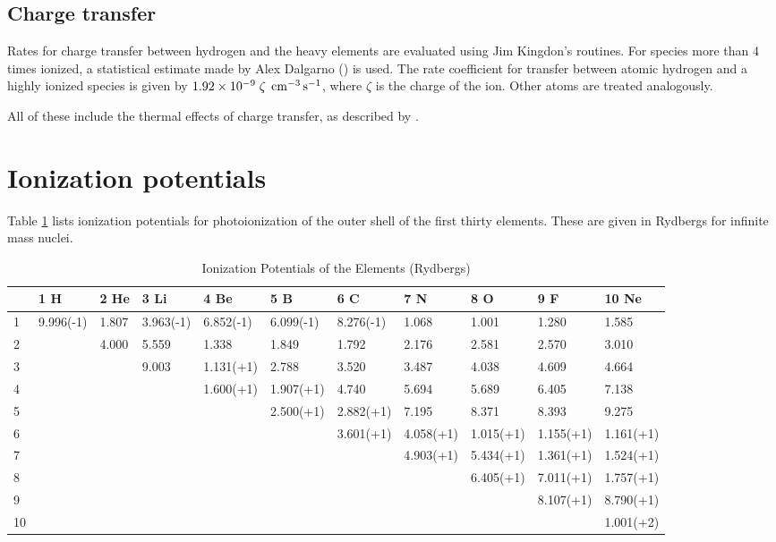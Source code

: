 \subsection{Charge transfer}

Rates for charge transfer between hydrogen and the heavy elements are
evaluated using Jim Kingdon's routines.   For species more than 4 times
ionized, a statistical estimate made by Alex Dalgarno (\citealp{Ferland1997})
is used.  The rate coefficient for transfer between atomic hydrogen and
a highly ionized species is given by
$1.92\times 10^{-9} \; \zeta \; {\rm\thinspace cm^{-3}} {\rm\thinspace s^{-1}}$,
where $\zeta$ is the
charge of the ion.  Other atoms are treated analogously.

All of these include the thermal effects of charge transfer, as described
by \citet{Kingdon1998b}.

\section{Ionization potentials}

Table \ref{tab:IonizationPotentials} lists ionization potentials for photoionization of the outer
shell of the first thirty elements.  These are given in Rydbergs for infinite
mass nuclei.

\begin{table}
\scriptsize
\caption{Ionization Potentials of the Elements (Rydbergs)}
\label{tab:IonizationPotentials}
\begin{tabular}{lllllllllll}
\hline
&1 H& 2 He& 3 Li& 4 Be& 5 B& 6 C& 7 N& 8 O& 9 F& 10 Ne\\
\hline
1& 9.996(-1)& 1.807& 3.963(-1)& 6.852(-1)& 6.099(-1)& 8.276(-1)& 1.068&
1.001& 1.280& 1.585\\
2&& 4.000& 5.559&
1.338& 1.849& 1.792& 2.176& 2.581& 2.570& 3.010\\
3&&&  9.003& 1.131(+1)& 2.788& 3.520&
3.487& 4.038& 4.609& 4.664\\
4&&&&  1.600(+1)& 1.907(+1)& 4.740& 5.694& 5.689& 6.405& 7.138\\
5&&&&&  2.500(+1)& 2.882(+1)& 7.195& 8.371& 8.393& 9.275\\
6&&&&&&
3.601(+1)& 4.058(+1)& 1.015(+1)& 1.155(+1)& 1.161(+1)\\
7&&&&&&& 4.903(+1)& 5.434(+1)& 1.361(+1)& 1.524(+1)\\
8&&&&&&&& 6.405(+1)& 7.011(+1)& 1.757(+1)\\
9&&&&&&&&& 8.107(+1)& 8.790(+1)\\
10&&&&&&&&&& 1.001(+2)\\
\hline
\end{tabular}
\end{table}

